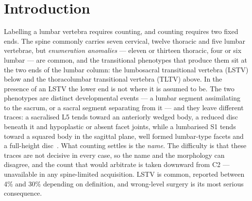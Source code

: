 \documentclass[aapm,mph,amsmath,amssymb,reprint,linenumbers]{revtex4-2}
\newcommand{\datasetdoi}{10.5281/zenodo.22139642}
\begin{document}
\begin{abstract}
\textbf{Data Format and Usage Notes:} Gzipped NIfTI image/label pairs sharing an
identical affine, canonicalised to PIR, with frozen patient-grouped LSTV-stratified
five-fold cross-validation splits and a reference loader. Archived at \datasetdoi.

\textbf{Potential Applications:} Segmentation and level-numbering benchmarks, anatomical
variant studies, surgical planning, and opportunistic screening research.
\emph{Limitations:} thoracic ground truth is field-of-view limited; postural angles are
supine; the soft-tissue identifiers are declared but unpopulated; the splits are
cross-validation folds and include no held-out test set; the rib layer is a reviewed
pseudolabel whose review was triaged by an automated rule rather than exhaustive; and the
Castellvi grades are one reader's, with confirmation by a board-certified neuroradiologist
in progress.
\end{abstract}

\maketitle

\section{Introduction}

Labelling a lumbar vertebra requires counting, and counting requires two fixed ends. The
spine commonly carries seven cervical, twelve thoracic and five lumbar vertebrae, but
\emph{enumeration anomalies} --- eleven or thirteen thoracic, four or six lumbar --- are
common, and the transitional phenotypes that produce them sit at the two ends of the lumbar
column: the lumbosacral transitional vertebra (LSTV) below and the thoracolumbar
transitional vertebra (TLTV) above. In the presence of an LSTV the lower end is not where it
is assumed to be. The two phenotypes are distinct developmental events --- a lumbar segment
assimilating to the sacrum, or a sacral segment separating from it --- and they leave
different traces: a sacralised L5 tends toward an anteriorly wedged body, a reduced disc
beneath it and hypoplastic or absent facet joints, while a lumbarised S1 tends toward a
squared body in the sagittal plane, well formed lumbar-type facets and a full-height
disc~\cite{koninwalz2010}. What counting settles is the \emph{name}. The difficulty is that
these traces are not decisive in every case, so the name and the morphology can disagree,
and the count that would arbitrate is taken downward from C2 --- unavailable in any
spine-limited acquisition. LSTV is common, reported between 4\% and 30\% depending on
definition, and wrong-level surgery is its most serious consequence.
\end{document}

